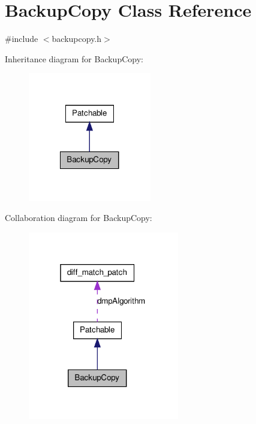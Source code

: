 \hypertarget{class_backup_copy}{
\section{BackupCopy Class Reference}
\label{class_backup_copy}
}


{\ttfamily \#include $<$backupcopy.h$>$}



Inheritance diagram for BackupCopy:\nopagebreak
\begin{figure}[H]
\begin{center}
\leavevmode
\includegraphics[width=152pt]{class_backup_copy__inherit__graph}
\end{center}
\end{figure}


Collaboration diagram for BackupCopy:\nopagebreak
\begin{figure}[H]
\begin{center}
\leavevmode
\includegraphics[width=187pt]{class_backup_copy__coll__graph}
\end{center}
\end{figure}
